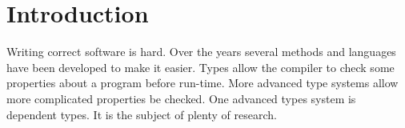 \documentclass[parskip=half]{scrartcl}
\begin{document}

%
%
%






\section{Introduction}


Writing correct software is hard. Over the years several methods and languages
have been developed to make it easier. Types allow the compiler to check some
properties about a program before run-time. More advanced type systems allow
more complicated properties be checked.
One advanced types system is dependent types. It is the subject of plenty
of research.
\end{document}
